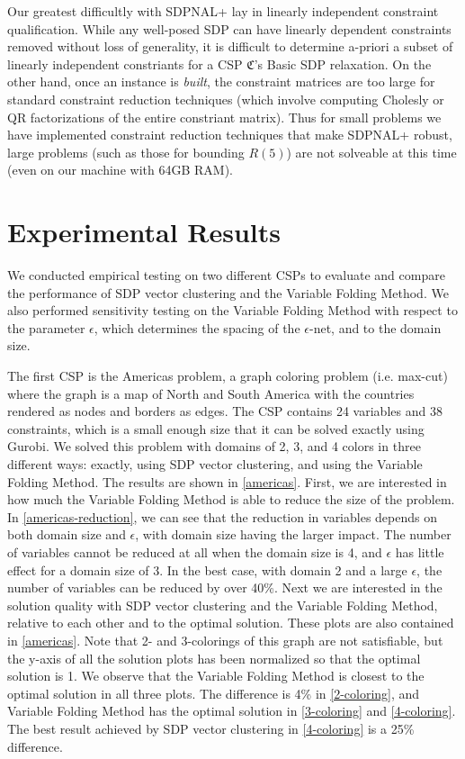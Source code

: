 \documentclass[12pt]{article} %
\begin{document}
Our greatest difficultly with SDPNAL+ lay in linearly independent constraint qualification. While any well-posed SDP can have linearly dependent constraints removed without loss of generality, it is difficult to determine a-priori a subset of linearly independent constriants for a CSP $\mathfrak{C}$'s Basic SDP relaxation. On the other hand, once an instance is \textit{built}, the constraint matrices are too large for standard constraint reduction techniques (which involve computing Cholesly or QR factorizations of the entire constriant matrix). Thus for small problems we have implemented constraint reduction techniques that make SDPNAL+ robust, large problems (such as those for bounding $R(5)$) are not solveable at this time (even on our machine with 64GB RAM).

\section{Experimental Results}

We conducted empirical testing on two different CSPs to evaluate and compare the performance of SDP vector clustering and the Variable Folding Method. We also performed sensitivity testing on the Variable Folding Method with respect to the parameter $\epsilon$, which determines the spacing of the $\epsilon$-net, and to the domain size.

The first CSP is the Americas problem, a graph coloring problem (i.e. max-cut) where the graph is a map of North and South America with the countries rendered as nodes and borders as edges. The CSP contains 24 variables and 38 constraints, which is a small enough size that it can be solved exactly using Gurobi. We solved this problem with domains of 2, 3, and 4 colors in three different ways: exactly, using SDP vector clustering, and using the Variable Folding Method. The results are shown in \autoref{americas}. First, we are interested in how much the Variable Folding Method is able to reduce the size of the problem. In \autoref{americas-reduction}, we can see that the reduction in variables depends on both domain size and $\epsilon$, with domain size having the larger impact. The number of variables cannot be reduced at all when the domain size is 4, and $\epsilon$ has little effect for a domain size of 3. In the best case, with domain 2 and a large $\epsilon$, the number of variables can be reduced by over 40\%. Next we are interested in the solution quality with SDP vector clustering and the Variable Folding Method, relative to each other and to the optimal solution. These plots are also contained in \autoref{americas}. Note that 2- and 3-colorings of this graph are not satisfiable, but the y-axis of all the solution plots has been normalized so that the optimal solution is 1. We observe that the Variable Folding Method is closest to the optimal solution in all three plots. The difference is 4\% in \ref{2-coloring}, and Variable Folding Method has the optimal solution in \ref{3-coloring} and \ref{4-coloring}. The best result achieved by SDP vector clustering in \ref{4-coloring} is a 25\% difference.
\end{document}
